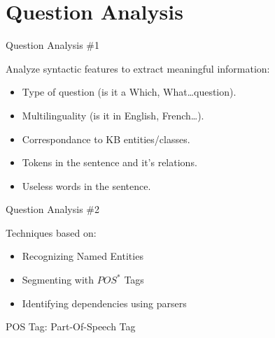 \documentclass{beamer}
\begin{document}
\section{Question Analysis}

\begin{frame}{Question Analysis \#1}
  \begin{card}
    Analyze syntactic features to extract meaningful information:
    \begin{itemize}
      \item Type of question (is it a Which, What\dots question).
      \item Multilinguality (is it in English, French\dots).
      \item Correspondance to KB entities/classes.
      \item Tokens in the sentence and it's relations.
      \item Useless words in the sentence.
    \end{itemize}
  \end{card}
\end{frame}

\begin{frame}{Question Analysis \#2}
  \begin{card}
    Techniques based on:
    \begin{itemize}
      \item Recognizing Named Entities
      \item Segmenting with $POS^{*}$ Tags
      \item Identifying dependencies using parsers
    \end{itemize}
  \end{card}
  \vspace{8em}
  POS Tag: Part-Of-Speech Tag
\end{frame}

\end{document}
